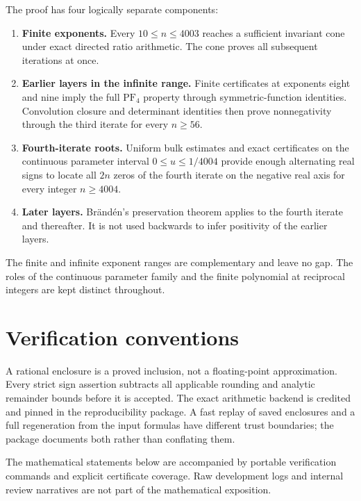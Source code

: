 \documentclass[
  11pt,
]{article}
\providecommand{\tightlist}{%
  \setlength{\itemsep}{0pt}\setlength{\parskip}{0pt}}
\begin{document}
The proof has four logically separate components:

\begin{enumerate}
\def\labelenumi{\arabic{enumi}.}
\tightlist
\item
  \textbf{Finite exponents.} Every \(10\le n\le4003\) reaches a
  sufficient invariant cone under exact directed ratio arithmetic. The
  cone proves all subsequent iterations at once.
\item
  \textbf{Earlier layers in the infinite range.} Finite certificates at
  exponents eight and nine imply the full \(\mathrm{PF}_4\) property
  through symmetric-function identities. Convolution closure and
  determinant identities then prove nonnegativity through the third
  iterate for every \(n\ge56\).
\item
  \textbf{Fourth-iterate roots.} Uniform bulk estimates and exact
  certificates on the continuous parameter interval \(0\le u\le1/4004\)
  provide enough alternating real signs to locate all \(2n\) zeros of
  the fourth iterate on the negative real axis for every integer
  \(n\ge4004\).
\item
  \textbf{Later layers.} Brändén's preservation theorem applies to the
  fourth iterate and thereafter. It is not used backwards to infer
  positivity of the earlier layers.
\end{enumerate}

The finite and infinite exponent ranges are complementary and leave no
gap. The roles of the continuous parameter family and the finite
polynomial at reciprocal integers are kept distinct throughout.

\section{Verification conventions}\label{verification-conventions}

A rational enclosure is a proved inclusion, not a floating-point
approximation. Every strict sign assertion subtracts all applicable
rounding and analytic remainder bounds before it is accepted. The exact
arithmetic backend is credited and pinned in the reproducibility
package. A fast replay of saved enclosures and a full regeneration from
the input formulas have different trust boundaries; the package
documents both rather than conflating them.

The mathematical statements below are accompanied by portable
verification commands and explicit certificate coverage. Raw development
logs and internal review narratives are not part of the mathematical
exposition.
\end{document}
